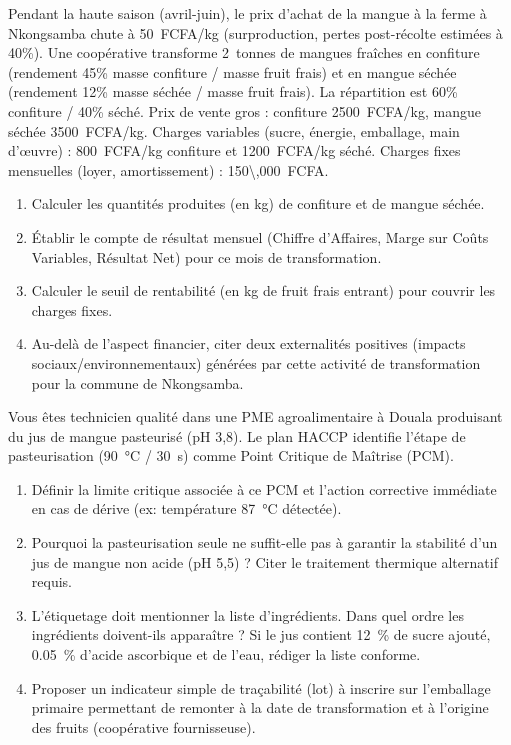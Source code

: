 \documentclass[11pt]{article}
\begin{document}
\begin{exercice}
\label{exo:eco}
Pendant la haute saison (avril-juin), le prix d'achat de la mangue à la ferme à Nkongsamba chute à \SI{50}{FCFA/kg} (surproduction, pertes post-récolte estimées à 40\%). Une coopérative transforme \SI{2}{tonnes} de mangues fraîches en confiture (rendement 45\% masse confiture / masse fruit frais) et en mangue séchée (rendement 12\% masse séchée / masse fruit frais). La répartition est 60\% confiture / 40\% séché. Prix de vente gros : confiture \SI{2500}{FCFA/kg}, mangue séchée \SI{3500}{FCFA/kg}. Charges variables (sucre, énergie, emballage, main d'œuvre) : \SI{800}{FCFA/kg} confiture et \SI{1200}{FCFA/kg} séché. Charges fixes mensuelles (loyer, amortissement) : \SI{150\,000}{FCFA}.
\begin{enumerate}
    \item Calculer les quantités produites (en kg) de confiture et de mangue séchée.
    \item Établir le compte de résultat mensuel (Chiffre d'Affaires, Marge sur Coûts Variables, Résultat Net) pour ce mois de transformation.
    \item Calculer le seuil de rentabilité (en kg de fruit frais entrant) pour couvrir les charges fixes.
    \item Au-delà de l'aspect financier, citer deux externalités positives (impacts sociaux/environnementaux) générées par cette activité de transformation pour la commune de Nkongsamba.
\end{enumerate}
\end{exercice}

\begin{exercice}
\label{exo:qualite}
Vous êtes technicien qualité dans une PME agroalimentaire à Douala produisant du jus de mangue pasteurisé (pH 3,8). Le plan HACCP identifie l'étape de pasteurisation (\SI{90}{\celsius} / \SI{30}{s}) comme Point Critique de Maîtrise (PCM).
\begin{enumerate}
    \item Définir la limite critique associée à ce PCM et l'action corrective immédiate en cas de dérive (ex: température \SI{87}{\celsius} détectée).
    \item Pourquoi la pasteurisation seule ne suffit-elle pas à garantir la stabilité d'un jus de mangue non acide (pH 5,5) ? Citer le traitement thermique alternatif requis.
    \item L'étiquetage doit mentionner la liste d'ingrédients. Dans quel ordre les ingrédients doivent-ils apparaître ? Si le jus contient \SI{12}{\%} de sucre ajouté, \SI{0,05}{\%} d'acide ascorbique et de l'eau, rédiger la liste conforme.
    \item Proposer un indicateur simple de traçabilité (lot) à inscrire sur l'emballage primaire permettant de remonter à la date de transformation et à l'origine des fruits (coopérative fournisseuse).
\end{enumerate}
\end{exercice}
\end{document}
